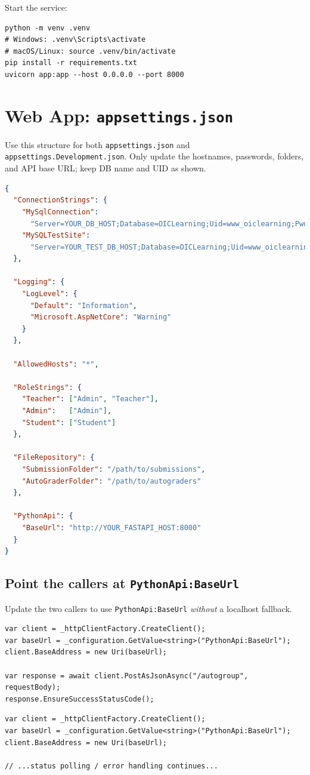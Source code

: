 \documentclass[ms,twoside,print]{nuthesis}
\begin{document}
\noindent Start the service:
\begin{lstlisting}
python -m venv .venv
# Windows: .venv\Scripts\activate
# macOS/Linux: source .venv/bin/activate
pip install -r requirements.txt
uvicorn app:app --host 0.0.0.0 --port 8000
\end{lstlisting}

\section{Web App: \texttt{appsettings.json}}
Use this structure for both \texttt{appsettings.json} and \texttt{appsettings.Development.json}.
Only update the hostnames, passwords, folders, and API base URL; keep DB name and UID as shown.

\begin{lstlisting}[language=json]
{
  "ConnectionStrings": {
    "MySqlConnection":
      "Server=YOUR_DB_HOST;Database=OICLearning;Uid=www_oiclearning;Pwd=YOUR_DB_PASSWORD",
    "MySQLTestSite":
      "Server=YOUR_TEST_DB_HOST;Database=OICLearning;Uid=www_oiclearning;Pwd=YOUR_TEST_DB_PASSWORD"
  },

  "Logging": {
    "LogLevel": {
      "Default": "Information",
      "Microsoft.AspNetCore": "Warning"
    }
  },

  "AllowedHosts": "*",

  "RoleStrings": {
    "Teacher": ["Admin", "Teacher"],
    "Admin":   ["Admin"],
    "Student": ["Student"]
  },

  "FileRepository": {
    "SubmissionFolder": "/path/to/submissions",
    "AutoGraderFolder": "/path/to/autograders"
  },

  "PythonApi": {
    "BaseUrl": "http://YOUR_FASTAPI_HOST:8000"
  }
}
\end{lstlisting}

\subsection*{Point the callers at \texttt{PythonApi:BaseUrl}}
Update the two callers to use \texttt{PythonApi:BaseUrl} \emph{without} a localhost fallback.
\noindent
\begin{minipage}{\linewidth}
\begin{lstlisting}[language=CSharp,title=CourseService.cs (snippet)]
var client = _httpClientFactory.CreateClient();
var baseUrl = _configuration.GetValue<string>("PythonApi:BaseUrl");
client.BaseAddress = new Uri(baseUrl);

var response = await client.PostAsJsonAsync("/autogroup", requestBody);
response.EnsureSuccessStatusCode();
\end{lstlisting}
\end{minipage}
\noindent
\begin{minipage}{\linewidth}
\begin{lstlisting}[language=CSharp,title=GroupingService.cs (snippet)]
var client = _httpClientFactory.CreateClient();
var baseUrl = _configuration.GetValue<string>("PythonApi:BaseUrl");
client.BaseAddress = new Uri(baseUrl);

// ...status polling / error handling continues...
\end{lstlisting}
\end{minipage}
\end{document}
